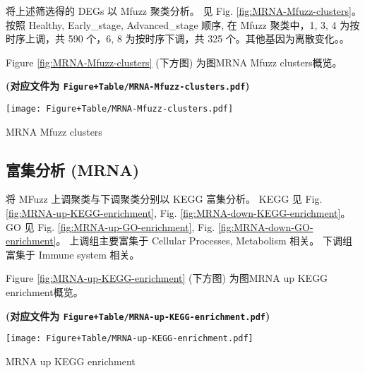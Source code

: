 \documentclass[
]{article}
\begin{document}
将上述筛选得的 DEGs 以 Mfuzz 聚类分析。
见 Fig. \ref{fig:MRNA-Mfuzz-clusters}。按照 Healthy, Early\_stage, Advanced\_stage 顺序, 在 Mfuzz 聚类中，1, 3, 4 为按时序上调，共 590 个，6, 8 为按时序下调，共 325 个。其他基因为离散变化。。

\begin{center}\vspace{1.5cm}\end{center}

Figure \ref{fig:MRNA-Mfuzz-clusters} (下方图) 为图MRNA Mfuzz clusters概览。

\textbf{(对应文件为 \texttt{Figure+Table/MRNA-Mfuzz-clusters.pdf})}

\def\@captype{figure}
\begin{center}
\texttt{[image: Figure+Table/MRNA-Mfuzz-clusters.pdf]}
\caption{MRNA Mfuzz clusters}\label{fig:MRNA-Mfuzz-clusters}
\end{center}

\begin{center}\vspace{1.5cm}\end{center}

\hypertarget{ux5bccux96c6ux5206ux6790-mrna}{%
\subsection{富集分析 (MRNA)}\label{ux5bccux96c6ux5206ux6790-mrna}}

将 MFuzz 上调聚类与下调聚类分别以 KEGG 富集分析。
KEGG 见 Fig. \ref{fig:MRNA-up-KEGG-enrichment}, Fig. \ref{fig:MRNA-down-KEGG-enrichment}。
GO 见 Fig. \ref{fig:MRNA-up-GO-enrichment}, Fig. \ref{fig:MRNA-down-GO-enrichment}。
上调组主要富集于 Cellular Processes, Metabolism 相关。
下调组富集于 Immune system 相关。

\begin{center}\vspace{1.5cm}\end{center}

Figure \ref{fig:MRNA-up-KEGG-enrichment} (下方图) 为图MRNA up KEGG enrichment概览。

\textbf{(对应文件为 \texttt{Figure+Table/MRNA-up-KEGG-enrichment.pdf})}

\def\@captype{figure}
\begin{center}
\texttt{[image: Figure+Table/MRNA-up-KEGG-enrichment.pdf]}
\caption{MRNA up KEGG enrichment}\label{fig:MRNA-up-KEGG-enrichment}
\end{center}
\end{document}

